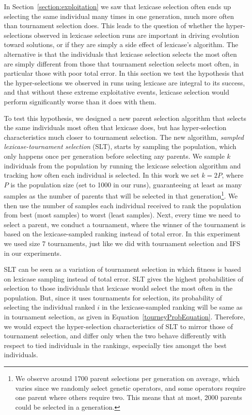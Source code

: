 \documentclass{sig-alternate-05-2015}
\newcommand{\definition}[1]{\textit{#1}}
\begin{document}
In Section~\ref{section:exploitation} we saw that lexicase selection often ends up selecting the same individual many times in one generation, much more often than tournament selection does. This leads to the question of whether the hyper-selections observed in lexicase selection runs are important in driving evolution toward solutions, or if they are simply a side effect of lexicase's algorithm. The alternative is that the individuals that lexicase selection selects the most often are simply different from those that tournament selection selects most often, in particular those with poor total error. In this section we test the hypothesis that the hyper-selections we observed in runs using lexicase are integral to its success, and that without these extreme exploitative events, lexicase selection would perform significantly worse than it does with them.

To test this hypothesis, we designed a new parent selection algorithm that selects the same individuals most often that lexicase does, but has hyper-selection characteristics much closer to tournament selection. The new algorithm, \definition{sampled lexicase-tournament selection} (SLT), starts by sampling the population, which only happens once per generation before selecting any parents. We sample $k$ individuals from the population by running the lexicase selection algorithm and tracking how often each individual is selected. In this work we set $k = 2P$, where $P$ is the population size (set to 1000 in our runs), guaranteeing at least as many samples as the number of parents that will be selected in that generation\footnote{We observe around 1700 parent selections per generation on average, which varies since we randomly select genetic operators, and some operators require one parent where others require two. This means that at most, 2000 parents could be selected in a generation.}. We then use the number of samples each individual received to rank the population from best (most samples) to worst (least samples). Next, every time we need to select a parent, we conduct a tournament, where the winner of the tournament is based on the lexicase-sampled ranking instead of total error. In this experiment we used size 7 tournaments, just like we did with tournament selection and IFS in our experiments.

SLT can be seen as a variation of tournament selection in which fitness is based on lexicase sampling instead of total error.
SLT gives the highest probabilities of selection to those individuals that lexicase would select the most often in the population. But, since it uses tournaments for selection, its probability of selecting the individual ranked $i$ in the lexicase-sampled ranking will be same as in tournament selection, as given in Equation~\ref{tourneyProbEquation}. Therefore, we would expect the hyper-selection characteristics of SLT to mirror those of tournament selection, and differ only when the two behave differently with respect to tied individuals in the rankings, especially ties amongst the best individuals.
\end{document}

